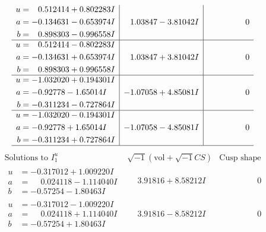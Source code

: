 \documentclass[1p]{elsarticle_modified}
\theoremstyle{definition}
\newcommand{\I}{\sqrt{-1}}
\begin{document}
$$\begin{array}{c|c|c}
\begin{aligned}
u &= \phantom{-}0.512414 + 0.802283 I \\
a &= -0.134631 - 0.653974 I \\
b &= \phantom{-}0.898303 - 0.996558 I\end{aligned}
 & \phantom{-}1.03847 - 3.81042 I & \phantom{-0.000000 } 0 \\ \hline\begin{aligned}
u &= \phantom{-}0.512414 - 0.802283 I \\
a &= -0.134631 + 0.653974 I \\
b &= \phantom{-}0.898303 + 0.996558 I\end{aligned}
 & \phantom{-}1.03847 + 3.81042 I & \phantom{-0.000000 } 0 \\ \hline\begin{aligned}
u &= -1.032020 + 0.194301 I \\
a &= -0.92778 - 1.65014 I \\
b &= -0.311234 - 0.727864 I\end{aligned}
 & -1.07058 + 4.85081 I & \phantom{-0.000000 } 0 \\ \hline\begin{aligned}
u &= -1.032020 - 0.194301 I \\
a &= -0.92778 + 1.65014 I \\
b &= -0.311234 + 0.727864 I\end{aligned}
 & -1.07058 - 4.85081 I & \phantom{-0.000000 } 0\\
 \hline 
 \end{array}$$\newpage$$\begin{array}{c|c|c}  
\text{Solutions to }I^u_{1}& \I (\text{vol} + \sqrt{-1}CS) & \text{Cusp shape}\\
 \hline 
\begin{aligned}
u &= -0.317012 + 1.009220 I \\
a &= \phantom{-}0.024118 - 1.114040 I \\
b &= -0.57254 - 1.80463 I\end{aligned}
 & \phantom{-}3.91816 + 8.58212 I & \phantom{-0.000000 } 0 \\ \hline\begin{aligned}
u &= -0.317012 - 1.009220 I \\
a &= \phantom{-}0.024118 + 1.114040 I \\
b &= -0.57254 + 1.80463 I\end{aligned}
 & \phantom{-}3.91816 - 8.58212 I & \phantom{-0.000000 } 0 \\ \hline\begin{aligned}

\end{aligned}
\end{array}$$
\end{document}
